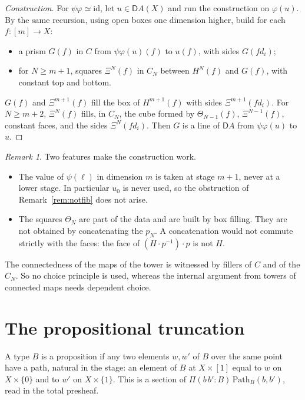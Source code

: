 \documentclass[11pt]{article}
\newcommand{\Path}{\mathrm{Path}}
\newcommand{\id}{\mathrm{id}}
\newcommand{\D}{\mathsf{D}}
\theoremstyle{plain}
\theoremstyle{definition}
\theoremstyle{remark}
\newtheorem{remark}[theorem]{Remark}
\begin{document}
\begin{proof}[Construction]
For $\psi\varphi\simeq\id$, let $u\in\D A(X)$ and run the construction on
$\varphi(u)$. By the same recursion, using open boxes one dimension
higher, build for each $f:[m]\to X$:
\begin{itemize}
\item a prism $G(f)$ in $C$ from $\psi\varphi(u)(f)$ to $u(f)$, with sides
  $G(fd_i)$;
\item for $N\ge m+1$, squares $\Xi^N(f)$ in $C_N$ between $H^N(f)$ and
  $G(f)$, with constant top and bottom.
\end{itemize}
$G(f)$ and $\Xi^{m+1}(f)$ fill the box of $H^{m+1}(f)$ with sides
$\Xi^{m+1}(fd_i)$. For $N\ge m+2$, $\Xi^N(f)$ fills, in $C_N$, the cube
formed by $\Theta_{N-1}(f)$, $\Xi^{N-1}(f)$, constant faces, and the sides
$\Xi^N(fd_i)$. Then $G$ is a line of $\D A$ from $\psi\varphi(u)$ to $u$.
\end{proof}

\begin{remark}
Two features make the construction work.
\begin{itemize}
\item The value of $\psi(\ell)$ in dimension $m$ is taken at stage $m+1$,
  never at a lower stage. In particular $u_0$ is never used, so the
  obstruction of Remark~\ref{rem:notfib} does not arise.
\item The squares $\Theta_N$ are part of the data and are built by box
  filling. They are not obtained by concatenating the $p_N$. A
  concatenation would not commute strictly with the faces: the face of
  $(H\cdot p^{-1})\cdot p$ is not $H$.
\end{itemize}
The connectedness of the maps of the tower is witnessed by fillers of
$C$ and of the $C_N$. So no choice principle is used, whereas the internal
argument from towers of connected maps needs dependent choice.
\end{remark}

\section{The propositional truncation}\label{sec:prop}

A type $B$ is a proposition if any two elements $w,w'$ of $B$ over the same
point have a path, natural in the stage: an element of $B$ at $X\times[1]$
equal to $w$ on $X\times\{0\}$ and to $w'$ on $X\times\{1\}$. This is a
section of $\Pi(b\,b':B)\,\Path_B(b,b')$, read in the total presheaf.
\end{document}
